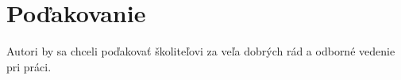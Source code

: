 \section*{Poďakovanie}
Autori by sa chceli poďakovať školiteľovi za veľa dobrých rád 
a odborné vedenie pri práci.

